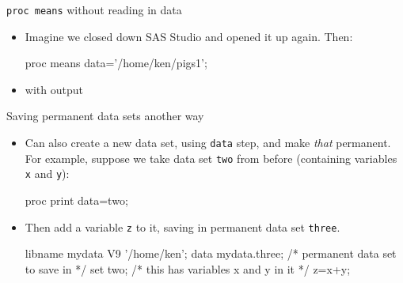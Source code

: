 \documentclass[unknownkeysallowed]{beamer}\usepackage[]{graphicx}\usepackage[]{color}
\begin{document}
\begin{frame}[fragile]{\texttt{proc means} without reading in data}
  
  \begin{itemize}
  \item Imagine we closed down SAS Studio and opened it up again. Then:
    
    \begin{Sascode}[store=md]
proc means data='/home/ken/pigs1';      
    \end{Sascode}
    
    
  \item with output
    
  \end{itemize}
  
\end{frame}


\begin{frame}[fragile]{Saving permanent data sets another way}
  
  \begin{itemize}
  \item Can also create a new data set, using \texttt{data} step, and
    make \emph{that} permanent. For example, suppose we take data set
    \texttt{two} from before (containing variables \texttt{x} and
    \texttt{y}):
    
    \begin{Sascode}[store=sozip, fontsize=footnotesize]
proc print data=two;      
    \end{Sascode}
    
    
    \item Then add a variable \texttt{z} to it, saving in
    permanent data set \texttt{three}.
    
    \begin{small}
  \begin{Datastep}
libname mydata V9 '/home/ken';    
data mydata.three; /* permanent data set to save in */
  set two; /* this has variables x and y in it */
  z=x+y;
  \end{Datastep}
      
    \end{small}
    
  \end{itemize}
  
\end{frame}
\end{document}
